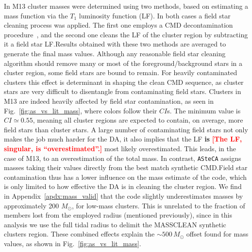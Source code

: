 \documentclass[draft]{aa}
\newcommand{\LEt}[1]{\textcolor{red}{\textbf{[#1]}}}
\begin{document}
In M13 cluster masses were determined using two methods, based on estimating
a mass function via the $T_1$ luminosity function (LF).
In both cases a field star cleaning process was applied. The first one employs
a CMD decontamination procedure~\citep{Maia_2010}, and the
second one cleans the LF of the cluster region by subtracting it a field star
LF.\@ Results obtained with these two methods are averaged to generate the final
mass values.
%
Although any reasonable field star cleaning algorithm should remove many or most
of the foreground/background stars in a cluster region, some field stars are
bound to remain. For heavily contaminated clusters this effect is
determinant in shaping the clean CMD sequence, as cluster stars are
very difficult to disentangle from contaminating field stars.
%
Clusters in M13 are indeed heavily affected by field star contamination,
as seen in Fig.~\ref{fig:as_vs_lit_mass}, where colors follow their $CI$s.
The minimum value is $CI{\simeq}0.55$, meaning all cluster regions are expected
to contain, on average, more field stars than cluster stars.
%
A large number of contaminating field stars not only makes the job much harder
for the DA, it also implies that the LF \textbf{is} \LEt{The LF, singular, is
``overestimated''.} most likely overestimated.
This leads, in the case of M13,  to an overestimation of the total mass.
%
In contrast, \texttt{ASteCA} assigns masses taking their values directly from
the best match synthetic CMD.\@ Field star contamination thus has a lower
influence on the mass estimate of the code, which is only limited to how
effective the DA is in cleaning the cluster region.
%
We find in Appendix~\ref{apdx:mass_valid} that the code slightly
underestimates masses by approximately 200 $M_{\odot}$, for low-mass
clusters. This is unrelated to the fraction of members lost from the employed radius (mentioned previously), since  in this analysis
we use the full tidal radius to delimit the MASSCLEAN synthetic clusters region.
These combined effects explain the ${\sim}500\,M_{\odot}$ offset found
for mass values, as shown in Fig.~\ref{fig:as_vs_lit_mass}.
\end{document}
